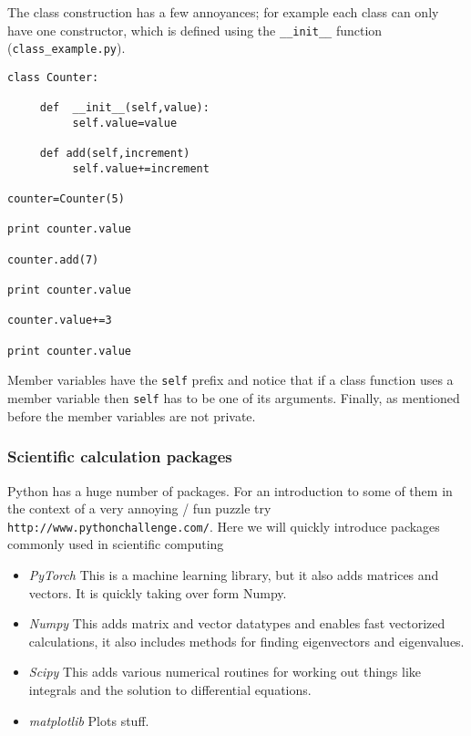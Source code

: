 \documentclass[12pt]{article}
\begin{document}
The class construction has a few annoyances; for example each class
can only have one constructor, which is defined using the
\texttt{\_\_init\_\_} function  (\texttt{class\_example.py}).
\begin{lstlisting}[numbers=right]
class Counter:

     def  __init__(self,value):
          self.value=value

     def add(self,increment)
          self.value+=increment

counter=Counter(5)

print counter.value

counter.add(7)

print counter.value

counter.value+=3

print counter.value

\end{lstlisting}
Member variables have the \texttt{self} prefix and notice that if a
class function uses a member variable then \texttt{self} has to be one
of its arguments. Finally, as mentioned before the member variables
are not private.


\subsubsection*{Scientific calculation packages}

Python has a huge number of packages. For an introduction to some of
them in the context of a very annoying / fun puzzle try
\texttt{http://www.pythonchallenge.com/}. Here we will quickly
introduce packages commonly used in scientific computing 
\begin{itemize}
\item \textsl{PyTorch} This is a machine learning library, but it also adds matrices and vectors. It is quickly taking over form Numpy.
\item \textsl{Numpy} This adds matrix and vector datatypes and enables
  fast vectorized calculations, it also includes methods for finding
  eigenvectors and eigenvalues.
\item \textsl{Scipy} This adds various numerical routines for working out things like integrals and the solution to differential equations.
\item \textsl{matplotlib} Plots stuff.
\end{itemize}
\end{document}
